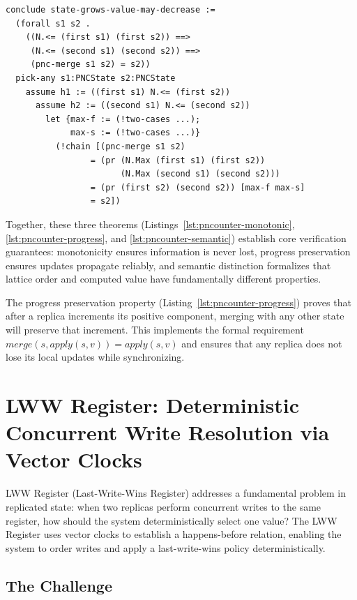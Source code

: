\begin{lstlisting}[language=Athena,style=athena,label={lst:pncounter-semantic},caption={PN-Counter: State grows but value may decrease}]
conclude state-grows-value-may-decrease :=
  (forall s1 s2 . 
    ((N.<= (first s1) (first s2)) ==> 
     (N.<= (second s1) (second s2)) ==>
     (pnc-merge s1 s2) = s2))
  pick-any s1:PNCState s2:PNCState
    assume h1 := ((first s1) N.<= (first s2))
      assume h2 := ((second s1) N.<= (second s2))
        let {max-f := (!two-cases ...);
             max-s := (!two-cases ...)}
          (!chain [(pnc-merge s1 s2)
                 = (pr (N.Max (first s1) (first s2))
                       (N.Max (second s1) (second s2)))
                 = (pr (first s2) (second s2)) [max-f max-s]
                 = s2])
\end{lstlisting}

Together, these three theorems (Listings~\ref{lst:pncounter-monotonic}, \ref{lst:pncounter-progress}, and \ref{lst:pncounter-semantic}) establish core verification guarantees: monotonicity ensures information is never lost, progress preservation ensures updates propagate reliably, and semantic distinction formalizes that lattice order and computed value have fundamentally different properties.

The progress preservation property (Listing~\ref{lst:pncounter-progress}) proves that after a replica increments its positive component, merging with any other state will preserve that increment. This implements the formal requirement $\mathit{merge}(s, \mathit{apply}(s, v)) = \mathit{apply}(s, v)$ and ensures that any replica does not lose its local updates while synchronizing. 

\section{LWW Register: Deterministic Concurrent Write Resolution via Vector Clocks}\label{sec:lww}

LWW Register (Last-Write-Wins Register) addresses a fundamental problem in replicated state: when two replicas perform concurrent writes to the same register, how should the system deterministically select one value? The LWW Register uses vector clocks to establish a happens-before relation, enabling the system to order writes and apply a last-write-wins policy deterministically.

\subsection{The Challenge}

